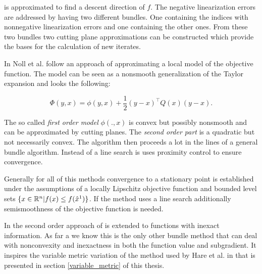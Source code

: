 is approximated to find a descent direction of \(f\).
The negative linearization errors are addressed by having two different bundles. One containing the indices with nonnegative linearization errors and one containing the other ones. From these two bundles two cutting plane approximations can be constructed which provide the bases for the calculation of new iterates.

In \cite{Noll2012} Noll et al. follow an approach of approximating a local model of the objective function. The model can be seen as a nonsmooth generalization of the Taylor expansion and looks the following:

\begin{equation}
	\Phi(y,x) = \phi(y,x)+\frac{1}{2}(y-x)^{\top}Q(x)(y-x).
\label{quad_mod}
\end{equation}

The so called \emph{first order model} \(\phi(.,x)\) is convex but possibly nonsmooth and can be approximated by cutting planes. The \emph{second order part} is a quadratic but not necessarily convex. The algorithm then proceeds a lot in the lines of a general bundle algorithm.
Instead of a line search is uses proximity control to ensure convergence.

Generally for all of this methods convergence to a stationary point is established under the assumptions of a locally Lipschitz objective function and bounded level sets \(\{x \in \mathbb{R}^n | f(x) \leq f(\hat{x}^1)\}\).
If the method uses a line search additionally semismoothness of the objective function is needed.

In \cite{Noll2013} the second order approach of \cite{Noll2012} is extended to functions with inexact information.
As far a we know this is the only other bundle method that can deal with nonconvexity and inexactness in both the function value and subgradient. It inspires the variable metric variation of the method used by Hare et al. in \cite{Hare2016} that is presented in section \ref{variable_metric} of this thesis.

